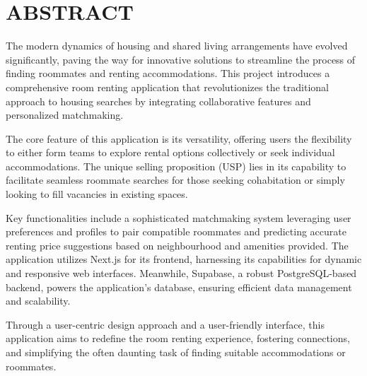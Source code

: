 \chapter*{ABSTRACT}

The modern dynamics of housing and shared living arrangements have evolved
significantly, paving the way for innovative solutions to streamline the process
of finding roommates and renting accommodations. This project introduces a
comprehensive room renting application that revolutionizes the traditional
approach to housing searches by integrating collaborative features and
personalized matchmaking.\par

\vspace{0.3cm}
The core feature of this application is its versatility, offering users the
flexibility to either form teams to explore rental options collectively or
seek individual accommodations. The unique selling proposition (USP) lies
in its capability to facilitate seamless roommate searches for those seeking
cohabitation or simply looking to fill vacancies in existing spaces.\par

\vspace{0.3cm}

Key functionalities include a sophisticated matchmaking system leveraging user
preferences and profiles to pair compatible roommates and predicting accurate
renting price suggestions based on neighbourhood and amenities provided.
The application utilizes Next.js for its frontend, harnessing its capabilities
for dynamic and responsive web interfaces. Meanwhile, Supabase, a robust
PostgreSQL-based backend, powers the application's database, ensuring efficient
data management and scalability.

\vspace{0.3cm}

Through a user-centric design approach and a user-friendly interface, this
application aims to redefine the room renting experience, fostering connections,
and simplifying the often daunting task of finding suitable accommodations or
roommates.

\cleardoublepage
